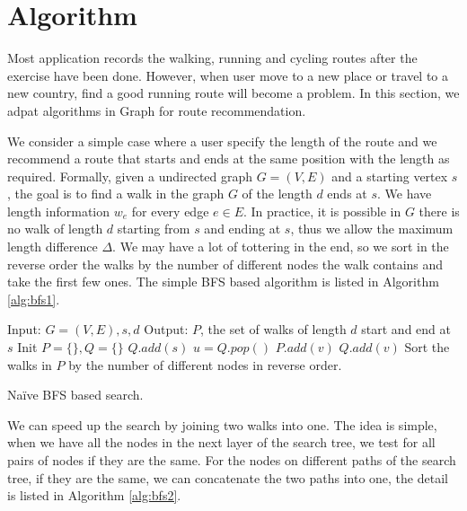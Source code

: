 
\section{Algorithm}

Most application records the walking, running and cycling routes after the 
exercise have been done. However, when user move to a new place or travel to
a new country, find a good running route will become a problem. In this
section, we adpat algorithms in Graph for route recommendation.

We consider a simple case where a user specify the length of the route and we
recommend a route that starts and ends at the same position with the length
as required. Formally, given a undirected graph $G = (V,E)$ and a starting 
vertex $s$, the goal is to find a walk in the graph $G$ of the length $d$ ends at $s$.
We have length information $w_e$ for every edge $e \in E$. In practice, it is 
possible in $G$ there is no walk of length $d$ starting from $s$ and ending at
$s$, thus we allow the maximum length difference $\Delta$. We may have a lot of tottering
in the end, so we sort in the reverse order the walks by the number of different nodes the
walk contains and take the first few ones. The simple BFS based algorithm is listed in
Algorithm \ref{alg:bfs1}.

\begin{algorithm}[H]
\begin{algorithmic}[1]
\STATE Input: $G=(V,E), s, d$
\STATE Output: $P$, the set of walks of length $d$ start and end at $s$
\STATE Init $P=\{\}, Q=\{\}$
\STATE $Q.add(s)$
\STATE$u = Q.pop()$
   \STATE $P.add(v)$
   \STATE $Q.add(v)$
  \ENDIF 
\ENDFOR
\ENDWHILE
\STATE Sort the walks in $P$ by the number of different nodes in reverse order.
\end{algorithmic}
\caption{Na\"ive BFS based search.}
\label{alg:bfs1}
\end{algorithm}

We can speed up the search by joining two walks into one. The idea is simple, when we have all
the nodes in the next layer of the search tree, we test for all pairs of nodes if they are the same.
For the nodes on different paths of the search tree, if they are the same, we can concatenate the two
paths into one, the detail is listed in Algorithm \ref{alg:bfs2}.

